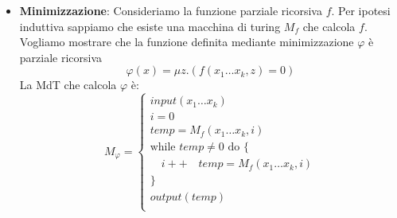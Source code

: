\documentclass[a4paper]{article}
\begin{document}
\begin{theorem}
\begin{itemize}
\begin{itemize}
      \item \textbf{Minimizzazione}: Consideriamo la funzione parziale ricorsiva
        \( f \). Per ipotesi induttiva sappiamo che esiste una macchina di turing \( M_f \)
        che calcola \( f \).
        Vogliamo mostrare che la funzione definita mediante minimizzazione \( \varphi \) è
        parziale ricorsiva
        \[
          \varphi(x) = \mu z. (f(x_1 \ldots x_k, z) = 0)
        \] 
        La MdT che calcola \( \varphi \) è:
        \[
          M_\varphi =
          \begin{cases}
            input(x_1 \ldots x_k) \\
            i = 0 \\
            temp = M_f(x_1 \ldots x_k, i) \\
            \text{while } temp \ne 0 \text{ do } \{ \\
            \quad i++
            \quad temp = M_f(x_1 \ldots x_k, i) \\
            \} \\
            output(temp) \\
          \end{cases}
        \]
    \end{itemize}


\end{itemize}
\end{theorem}
\end{document}
